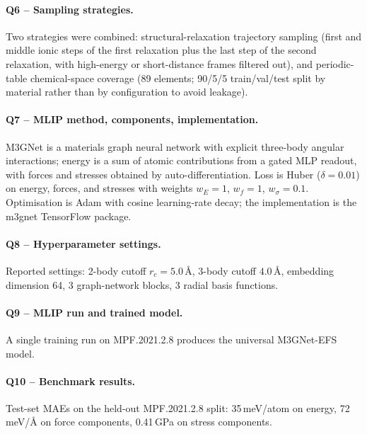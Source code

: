 \paragraph{Q6 -- Sampling strategies.}
Two strategies were combined: structural-relaxation trajectory
sampling (first and middle ionic steps of the first relaxation plus
the last step of the second relaxation, with high-energy or
short-distance frames filtered out), and periodic-table chemical-space
coverage (89 elements; 90/5/5 train/val/test split by material rather
than by configuration to avoid leakage).


\paragraph{Q7 -- MLIP method, components, implementation.}
M3GNet is a materials graph neural network with explicit three-body
angular interactions; energy is a sum of atomic contributions from a
gated MLP readout, with forces and stresses obtained by
auto-differentiation. Loss is Huber ($\delta=0.01$) on energy, forces,
and stresses with weights $w_E=1$, $w_f=1$, $w_\sigma=0.1$. Optimisation
is Adam with cosine learning-rate decay; the implementation is the
m3gnet TensorFlow package.


\paragraph{Q8 -- Hyperparameter settings.}
Reported settings: 2-body cutoff $r_c = 5.0$\,\AA, 3-body cutoff
$4.0$\,\AA, embedding dimension 64, 3 graph-network blocks, 3 radial
basis functions.


\paragraph{Q9 -- MLIP run and trained model.}
A single training run on MPF.2021.2.8 produces the universal
M3GNet-EFS model.


\paragraph{Q10 -- Benchmark results.}
Test-set MAEs on the held-out MPF.2021.2.8 split: 35\,meV/atom on
energy, 72\,meV/\AA{} on force components, 0.41\,GPa on stress
components.


